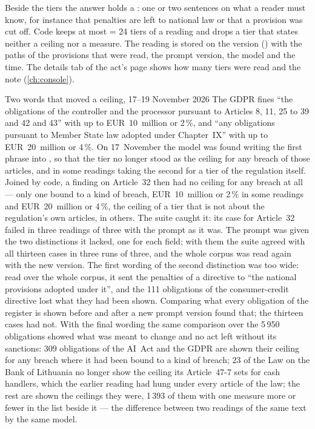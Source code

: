 Beside the tiers the answer holds a : one or two sentences on what a reader must
know, for instance that penalties are left to national law or that a provision was cut off.
Code keeps at most  = 24 tiers of a reading and drops a tier that states
neither a ceiling nor a measure. The reading is stored on the version
() with the paths of the provisions that were read,
the prompt version, the model and the time. The details tab of the act's page shows how many
tiers were read and the note (\cref{ch:console}).

\begin{lessonbox}{Two words that moved a ceiling, 17--19 November 2026}
The GDPR fines \enquote{the obligations of the controller and the processor pursuant to
Articles 8, 11, 25 to 39 and 42 and 43} with up to EUR~10~million or 2\,\%, and \enquote{any
obligations pursuant to Member State law adopted under Chapter~IX} with up to EUR~20~million
or 4\,\%. On 17~November the model was found writing the first phrase into ,
so that the tier no longer stood as the ceiling for any breach of those articles, and in some
readings taking the second for a tier of the regulation itself. Joined by code, a finding on
Article~32 then had no ceiling for any breach at all --- only one bound to a kind of breach,
EUR~10~million or 2\,\% in some readings and EUR~20~million or 4\,\%, the ceiling of a tier that
is not about the regulation's own articles, in others. The suite caught it: its case for
Article~32 failed in three readings of three with the prompt as it was. The prompt was given
the two distinctions it lacked, one for each field; with them the suite agreed with all
thirteen cases in three runs of three, and the whole corpus was read again with the new
version. The first wording of the second distinction was too wide: read over the whole
corpus, it sent the penalties of a directive to \enquote{the national provisions adopted
under it}, and the 111 obligations of the consumer-credit directive lost what they had been
shown. Comparing what every obligation of the register is shown before and after a new
prompt version found that; the thirteen cases had not. With the final wording the same
comparison over the 5\,950 obligations showed what was meant to change and no act left
without its sanctions: 309 obligations of the AI~Act and the GDPR are shown their ceiling
for any breach where it had been bound to a kind of breach; 23 of the Law on the Bank of
Lithuania no longer show the ceiling its Article~47-7 sets for cash handlers, which the
earlier reading had hung under every article of the law; the rest are shown the ceilings
they were, 1\,393 of them with one measure more or fewer in the list beside it --- the
difference between two readings of the same text by the same model.
\end{lessonbox}

